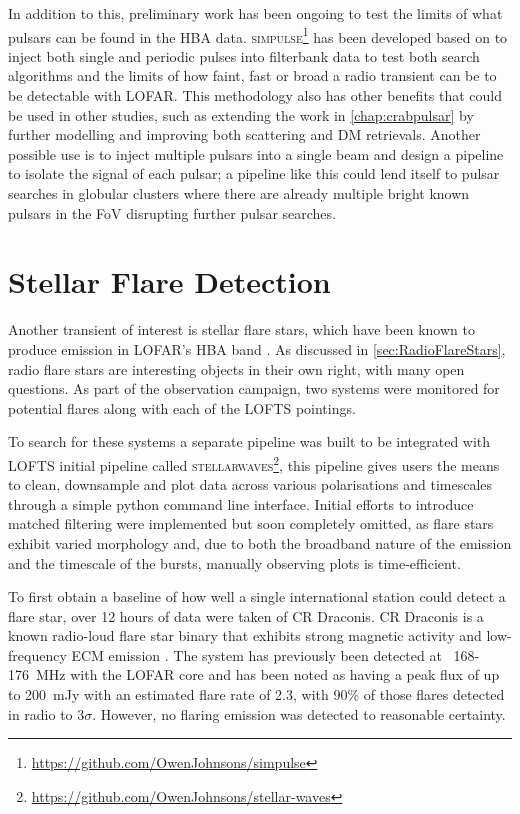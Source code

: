 In addition to this, preliminary work has been ongoing to test the limits of what pulsars can be found in the HBA data. \textsc{simpulse}\footnote{\url{https://github.com/OwenJohnsons/simpulse}} has been developed based on \cite{qiu_systematic_2023} to inject both single and periodic pulses into filterbank data to test both search algorithms and the limits of how faint, fast or broad a radio transient can be to be detectable with LOFAR. This methodology also has other benefits that could be used in other studies, such as extending the work in \cref{chap:crabpulsar} by further modelling and improving both scattering and DM retrievals. Another possible use is to inject multiple pulsars into a single beam and design a pipeline to isolate the signal of each pulsar; a pipeline like this could lend itself to pulsar searches in globular clusters where there are already multiple bright known pulsars in the FoV disrupting further pulsar searches. 

\section{Stellar Flare Detection}
Another transient of interest is stellar flare stars, which have been known to produce emission in LOFAR's HBA band \citep[i.e.][]{CR_Draconis_LOFAR}. As discussed in \cref{sec:RadioFlareStars}, radio flare stars are interesting objects in their own right, with many open questions. As part of the observation campaign, two systems were monitored for potential flares along with each of the LOFTS pointings. 

To search for these systems a separate pipeline was built to be integrated with LOFTS initial pipeline called \textsc{stellarwaves}\footnote{\url{https://github.com/OwenJohnsons/stellar-waves}}, this pipeline gives users the means to clean, downsample and plot data across various polarisations and timescales through a simple python command line interface. Initial efforts to introduce matched filtering were implemented but soon completely omitted, as flare stars exhibit varied morphology and, due to both the broadband nature of the emission and the timescale of the bursts, manually observing plots is time-efficient. 

To first obtain a baseline of how well a single international station could detect a flare star, over 12 hours of data were taken of CR Draconis. CR Draconis is a known radio-loud flare star binary that exhibits strong magnetic activity and low-frequency ECM emission \citep{CR_Draconis_LOFAR}. The system has previously been detected at ~168-176~MHz with the LOFAR core and has been noted as having a peak flux of up to 200~mJy with an estimated flare rate of 2.3, with 90\% of those flares detected in radio to $3\sigma$. However, no flaring emission was detected to reasonable certainty. 

